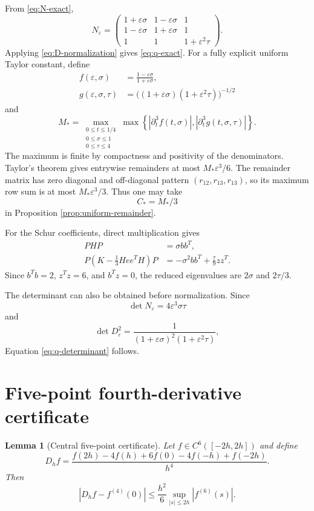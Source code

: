 \documentclass[11pt]{article}
\newtheorem{lemma}[theorem]{Lemma}
\newcommand{\eps}{\varepsilon}
\begin{document}
From \eqref{eq:N-exact},
\[
  N_\eps=
  \begin{pmatrix}
  1+\eps\sigma&1-\eps\sigma&1\\
  1-\eps\sigma&1+\eps\sigma&1\\
  1&1&1+\eps^2\tau
  \end{pmatrix}.
\]
Applying \eqref{eq:D-normalization} gives \eqref{eq:q-exact}.  For a fully explicit uniform Taylor constant, define
\begin{align*}
  f(\eps,\sigma)&=\frac{1-\eps\sigma}{1+\eps\sigma},\\
  g(\eps,\sigma,\tau)&=\bigl((1+\eps\sigma)(1+\eps^2\tau)\bigr)^{-1/2}
\end{align*}
and
\begin{equation}
  M_*
  =\max_{\substack{0\le t\le1/4\\0\le\sigma\le1\\0\le\tau\le4}}
  \max\left\{
  |\partial_t^3f(t,\sigma)|,
  |\partial_t^3g(t,\sigma,\tau)|
  \right\}.
  \label{eq:M-star}
\end{equation}
The maximum is finite by compactness and positivity of the denominators.  Taylor's theorem gives entrywise remainders at most $M_*\eps^3/6$.  The remainder matrix has zero diagonal and off-diagonal pattern $(r_{12},r_{13},r_{13})$, so its maximum row sum is at most $M_*\eps^3/3$.  Thus one may take
\begin{equation}
  C_*=M_*/3
  \label{eq:C-star}
\end{equation}
in Proposition \ref{prop:uniform-remainder}.

For the Schur coefficients, direct multiplication gives
\begin{align*}
  PHP&=\sigma bb^T,\\
  P\left(K-\frac13Hee^TH\right)P
  &=-\sigma^2bb^T+\frac{\tau}{9}zz^T.
\end{align*}
Since $b^Tb=2$, $z^Tz=6$, and $b^Tz=0$, the reduced eigenvalues are $2\sigma$ and $2\tau/3$.

The determinant can also be obtained before normalization.  Since
\[
  \det N_\eps=4\eps^3\sigma\tau
\]
and
\[
  \det D_\eps^2
  =\frac{1}{(1+\eps\sigma)^2(1+\eps^2\tau)},
\]
Equation \eqref{eq:q-determinant} follows.

\section{Five-point fourth-derivative certificate}
\label{app:five-point}

\begin{lemma}[Central five-point certificate]
Let $f\in C^6([-2h,2h])$ and define
\begin{equation}
  D_hf
  =\frac{f(2h)-4f(h)+6f(0)-4f(-h)+f(-2h)}{h^4}.
  \label{eq:five-point}
\end{equation}
Then
\begin{equation}
  \left|D_hf-f^{(4)}(0)\right|
  \le\frac{h^2}{6}
  \sup_{|s|\le2h}|f^{(6)}(s)|.
  \label{eq:five-point-error}
\end{equation}
\end{lemma}
\end{document}
